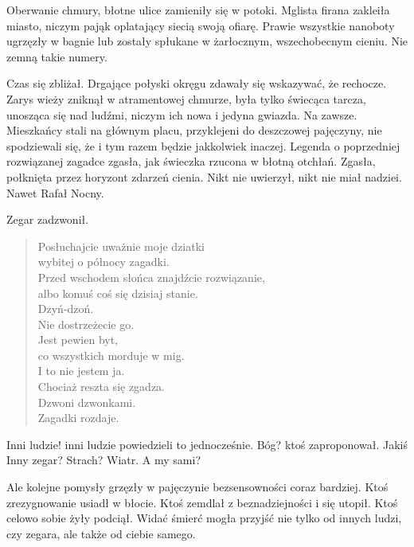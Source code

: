 Oberwanie chmury, błotne ulice zamieniły się w potoki.
Mglista firana zakleiła miasto, niczym pająk oplatający siecią swoją ofiarę.
Prawie wszystkie nanoboty ugrzęzły w bagnie lub zostały spłukane w żarłocznym, wszechobecnym cieniu.
Nie zemną takie numery.

Czas się zbliżał.
Drgające połyski okręgu zdawały się wskazywać, że rechocze.
Zarys wieży zniknął w atramentowej chmurze, była tylko świecąca tarcza, unosząca się nad ludźmi, niczym ich nowa i jedyna gwiazda.
Na zawsze.
Mieszkańcy stali na głównym placu, przyklejeni do deszczowej pajęczyny, nie spodziewali się, że i tym razem będzie jakkolwiek inaczej.
Legenda o poprzedniej rozwiązanej zagadce zgasła, jak świeczka rzucona w błotną otchłań. 
Zgasła, połknięta przez horyzont zdarzeń cienia.
Nikt nie uwierzył, nikt nie miał nadziei.
Nawet Rafał Nocny.

Zegar zadzwonił.

\begin{sl}
\begin{quote}
Posłuchajcie uważnie moje dziatki \\
wybitej o północy zagadki. \\
Przed wschodem słońca znajdźcie rozwiązanie, \\
albo komuś coś się dzisiaj stanie. \\
Dzyń-dzoń. \\
Nie dostrzeżecie go. \\
Jest pewien byt, \\
co wszystkich morduje w mig. \\
I to nie jestem ja. \\
Chociaż reszta się zgadza. \\
Dzwoni dzwonkami. \\
Zagadki rozdaje. \\
\end{quote}
\end{sl}

\begin{dialogue}
	\ds{} Inni ludzie! \dm{} inni ludzie powiedzieli to jednocześnie.
	\ds{} Bóg? \dm{} ktoś zaproponował.
	\ds{} Jakiś Inny zegar?
	\ds{} Strach?
	\ds{} Wiatr.
	\ds{} A my sami?
\end{dialogue}
Ale kolejne pomysły grzęzły w pajęczynie bezsensowności coraz bardziej.
Ktoś zrezygnowanie usiadł w błocie.
Ktoś zemdlał z beznadziejności i się utopił.
Ktoś celowo sobie żyły podciął.
Widać śmierć mogła przyjść nie tylko od innych ludzi, czy zegara, ale także od ciebie samego.

